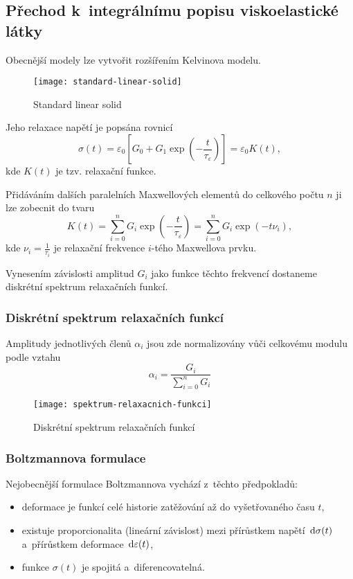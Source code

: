 
\subsection{Přechod k~integrálnímu popisu viskoelastické látky}
Obecnější modely lze vytvořit rozšířením Kelvinova modelu.
\begin{figure}[H]
	\centering
	\texttt{[image: standard-linear-solid]}
	\caption{Standard linear solid}%
\end{figure}

Jeho relaxace napětí je popsána rovnicí
\begin{equation}
	\sigma(t) = \varepsilon_0 \left[G_0 + G_1 \exp\! \left(-\frac{t}{\tau_\varepsilon} \right) \right] = \varepsilon_0 K(t),
\end{equation}
kde $K(t)$ je tzv. relaxační funkce.

Přidáváním dalších paralelních Maxwellových elementů do celkového počtu $n$ ji lze zobecnit do tvaru
\begin{equation}
	K(t) = \sum\limits_{i=0}^n G_i \exp\! \left(-\frac{t}{\tau_\varepsilon} \right) = \sum\limits_{i=0}^n G_i \exp\! \left(-t \nu_i\right),
\end{equation}
kde $\nu_i = \frac{1}{\tau_i}$ je relaxační frekvence $i$-tého Maxwellova prvku.

Vynesením závislosti amplitud $G_i$ jako funkce těchto frekvencí dostaneme diskrétní spektrum relaxačních funkcí.

\subsubsection{Diskrétní spektrum relaxačních funkcí}
Amplitudy jednotlivých členů $\alpha_i$ jsou zde normalizovány vůči celkovému modulu podle vztahu
\begin{equation}
	\alpha_i = \frac{G_i}{\sum_{i=0}^n G_i}
\end{equation}

\begin{figure}[H]
	\centering
	\texttt{[image: spektrum-relaxacnich-funkci]}
	\caption{Diskrétní spektrum relaxačních funkcí}
	\label{fig:spektrum-relaxacnich-funkci}
\end{figure}

\subsubsection{Boltzmannova formulace}
Nejobecnější formulace Boltzmannova vychází z~těchto předpokladů:
\begin{itemize}
	\item deformace je funkcí celé historie zatěžování až do vyšetřovaného času $t$,
	\item existuje proporcionalita (lineární závislost) mezi přírůstkem napětí $\,\mathrm{d} \sigma(t)$ a~přírůstkem deformace $\,\mathrm{d} \varepsilon(t)$,
	\item funkce $\sigma(t)$ je spojitá a~diferencovatelná.
\end{itemize}


